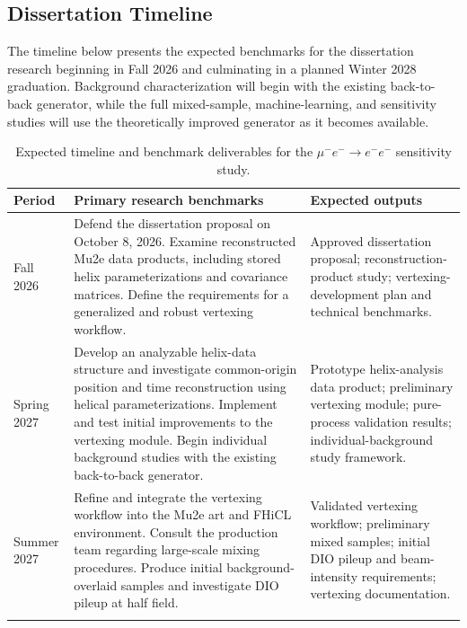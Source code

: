 \documentclass[12pt]{article}
\begin{document}
\subsection{Dissertation Timeline} \label{subsec:Timeline}

The timeline below presents the expected benchmarks for the dissertation research beginning in Fall 2026 and culminating in a planned Winter 2028 graduation. Background characterization will begin with the existing back-to-back generator, while the full mixed-sample, machine-learning, and sensitivity studies will use the theoretically improved generator as it becomes available.

\clearpage
{}

\begin{landscape}
\begin{table}[p]
\centering
\caption{Expected timeline and benchmark deliverables for the
\(\mu^- e^- \rightarrow e^- e^-\) sensitivity study.}
\label{tab:DissertationTimeline}

\footnotesize
\renewcommand{\arraystretch}{1.15}
\setlength{\tabcolsep}{3pt}

\begin{tabular}{p{2.3cm} p{9.8cm} p{9.8cm}}
\toprule
\textbf{Period} &
\textbf{Primary research benchmarks} &
\textbf{Expected outputs} \\
\midrule

Fall 2026 &
Defend the dissertation proposal on October 8, 2026. Examine reconstructed Mu2e data products, including stored helix parameterizations and covariance matrices. Define the requirements for a generalized and robust vertexing workflow. &
Approved dissertation proposal; reconstruction-product study; vertexing-development plan and technical benchmarks. \\
\addlinespace

Spring 2027 &
Develop an analyzable helix-data structure and investigate common-origin position and time reconstruction using helical parameterizations. Implement and test initial improvements to the vertexing module. Begin individual background studies with the existing back-to-back generator. &
Prototype helix-analysis data product; preliminary vertexing module; pure-process validation results; individual-background study framework. \\
\addlinespace

Summer 2027 &
Refine and integrate the vertexing workflow into the Mu2e art and FHiCL environment. Consult the production team regarding large-scale mixing procedures. Produce initial background-overlaid samples and investigate DIO pileup at half field. &
Validated vertexing workflow; preliminary mixed samples; initial DIO pileup and beam-intensity requirements; vertexing documentation. \\
\addlinespace


\end{tabular}
\end{table}
\end{landscape}
\end{document}
